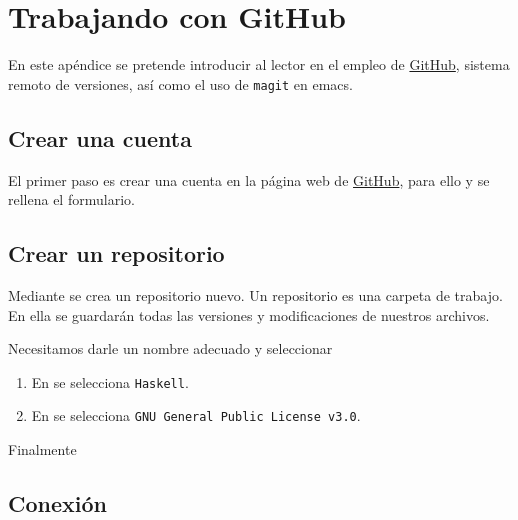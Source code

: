 \appendix

\chapter{Trabajando con GitHub} \label{aped.A}

En este apéndice se pretende introducir al lector en el empleo de
\href{https://github.com/}{GitHub}, sistema remoto de versiones, así como el uso
de \texttt{magit} en emacs.

\section{Crear una cuenta}

El primer paso es crear una cuenta en la página web de
\href{https://github.com/}{GitHub}, para ello  y se
rellena el formulario.

\section{Crear un repositorio}

Mediante  se crea un repositorio nuevo.  Un
repositorio es una carpeta de trabajo. En ella se guardarán todas las versiones
y modificaciones de nuestros archivos.

Necesitamos darle un nombre adecuado y seleccionar
\begin{enumerate}
\item En  se selecciona \texttt{Haskell}.
\item En  se selecciona \texttt{GNU General Public License v3.0}.
\end{enumerate}

Finalmente 

\section{Conexión}

